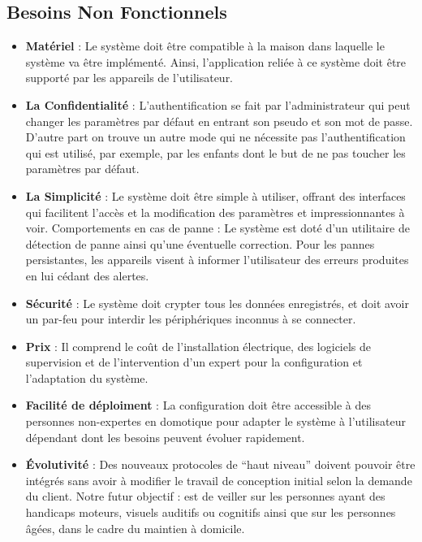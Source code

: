 \begin{spacing}{1.2}
\subsection{Besoins Non Fonctionnels}
\begin{itemize}
    \item \textbf{Matériel} : Le système doit être compatible à la maison dans laquelle le système va être implémenté. Ainsi, l’application reliée à ce système doit être supporté par les appareils de l’utilisateur.
    \item \textbf{La Confidentialité} : L’authentification se fait par l’administrateur qui peut changer les paramètres par défaut en entrant son pseudo et son mot de passe. D’autre part on trouve un autre mode qui ne nécessite pas l’authentification qui est utilisé, par exemple, par les enfants dont le but de ne pas toucher les paramètres par défaut.
    \item \textbf{La Simplicité} : Le système doit être simple à utiliser, offrant des interfaces qui facilitent l’accès et la modification des paramètres et impressionnantes à voir.
Comportements en cas de panne : Le système est doté d'un utilitaire de détection de panne ainsi qu'une éventuelle correction. Pour les pannes persistantes, les appareils visent à informer l'utilisateur des erreurs produites en lui cédant des alertes.

    \item \textbf{Sécurité} : Le système doit crypter tous les données enregistrés, et doit avoir un par-feu pour interdir les périphériques inconnus à se connecter.
    
    \item \textbf{Prix} : Il comprend le coût de l’installation électrique, des logiciels de supervision et de l’intervention d’un expert pour la configuration et l’adaptation du système.
    \item \textbf{Facilité de déploiment} : La configuration doit être accessible à des personnes non-expertes en domotique pour adapter le système à l’utilisateur dépendant dont les besoins peuvent évoluer rapidement.
    
    \item \textbf{Évolutivité} : Des nouveaux protocoles de “haut niveau” doivent pouvoir être intégrés sans avoir à modifier le travail de conception initial selon la demande du client.
Notre futur objectif : est de veiller sur les personnes ayant des handicaps moteurs, visuels auditifs ou cognitifs ainsi que sur les personnes âgées, dans le cadre du maintien à domicile.
\end{itemize}


\end{spacing}
